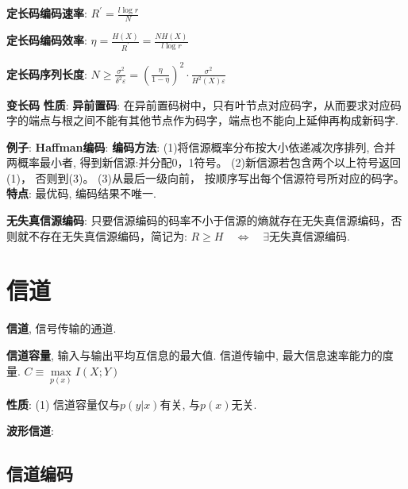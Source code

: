 \documentclass{article}
\newcommand{\defi}[2]{\textbf{#1}, #2}
\begin{document}
                \textbf{定长码编码速率}: $R^{\prime}=\frac{l \log r}{N}$

                \textbf{定长码编码效率}: $\eta=\frac{H(X)}{R^{\prime}}=\frac{N H(X)}{l \log r}$
                
                \textbf{定长码序列长度}: $N \geqslant \frac{\sigma^{2}}{\delta^{2} \varepsilon}=\left(\frac{\eta}{1-\eta}\right)^{2} \cdot \frac{\sigma^{2}}{H^{2}(X) \varepsilon}$

        \textbf{变长码}  
            \textbf{性质}:
                \textbf{异前置码}: 在异前置码树中，只有叶节点对应码字，从而要求对应码字的端点与根之间不能有其他节点作为码字，端点也不能向上延伸再构成新码字.
                
            \textbf{例子}:
                \textbf{Haffman编码}:
                    \textbf{编码方法}:
                        (1)将信源概率分布按大小依递减次序排列, 合并两概率最小者, 得到新信源:并分配0，1符号。
                        (2)新信源若包含两个以上符号返回(1)， 否则到(3)。
                        (3)从最后一级向前， 按顺序写出每个信源符号所对应的码字。
                    \textbf{特点}:
                        最优码, 编码结果不唯一.
                    
        \textbf{无失真信源编码}: 只要信源编码的码率不小于信源的熵就存在无失真信源编码，否则就不存在无失真信源编码，简记为: $ R \ge H \quad \Leftrightarrow  \quad \exists \text{无失真信源编码}$.
        

\section{信道}
    \defi{信道}{信号传输的通道.}

    \defi{信道容量}{输入与输出平均互信息的最大值. 信道传输中, 最大信息速率能力的度量. $C \equiv \max\limits_{p(x)} I(X ; Y)$}
    
        \textbf{性质}:
            (1) 信道容量仅与$p(y|x)$有关, 与$p(x)$无关.

    \textbf{波形信道}: 

    \subsection{信道编码}
        
\end{document}
